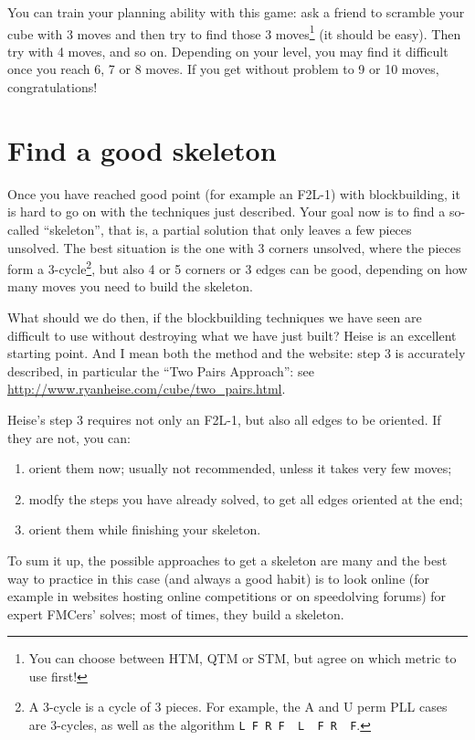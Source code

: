 \documentclass[11pt,a4paper]{book}
\newcommand{\p}{\textquotesingle}
\newcommand{\m}{\texttt}
\newcommand{\ps}{\p\,\,}
\begin{document}
You can train your planning ability with this game: ask a friend to scramble your cube with 3 moves and then try to find those 3 moves\footnote{You can choose between HTM, QTM or STM, but agree on which metric to use first!} (it should be easy). Then try with 4 moves, and so on. Depending on your level, you may find it difficult once you reach 6, 7 or 8 moves. If you get without problem to 9 or 10 moves, congratulations!

\section{Find a good skeleton}

Once you have reached good point (for example an F2L-1) with blockbuilding, it is hard to go on with the techniques just described. Your goal now is to find a so-called ``skeleton'', that is, a partial solution that only leaves a few pieces unsolved. The best situation is the one with 3 corners unsolved, where the pieces form a 3-cycle\footnote{A 3-cycle is a cycle of 3 pieces. For example, the A and U perm PLL cases are 3-cycles, as well as the algorithm \m{L F R F\ps L\ps F R\ps F\p}.}, but also 4 or 5 corners or 3 edges can be good, depending on how many moves you need to build the skeleton.

What should we do then, if the blockbuilding techniques we have seen are difficult to use without destroying what we have just built? Heise is an excellent starting point. And I mean both the method and the website: step 3 is accurately described, in particular the ``Two Pairs Approach'': see \url{http://www.ryanheise.com/cube/two_pairs.html}.

Heise's step 3 requires not only an F2L-1, but also all edges to be oriented. If they are not, you can:
\begin{enumerate}
\item orient them now; usually not recommended, unless it takes very few moves;
\item modfy the steps you have already solved, to get all edges oriented at the end;
\item orient them while finishing your skeleton.
\end{enumerate}

To sum it up, the possible approaches to get a skeleton are many and the best way to practice in this case (and always a good habit) is to look online (for example in websites hosting online competitions or on speedolving forums) for expert FMCers' solves; most of times, they build a skeleton.
\end{document}
